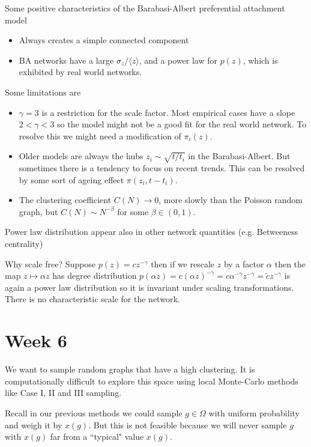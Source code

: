 \documentclass[12pt]{article}
\theoremstyle{definition}
\begin{document}
Some positive characteristics of the Barabasi-Albert preferential attachment model

\begin{itemize}
    \item Always creates a simple connected component
    \item BA networks have a large $\sigma_z/\langle z\rangle$, and a power law for $p(z)$, which is exhibited by real world networks.
\end{itemize}

Some limitations are
\begin{itemize}
    \item $\gamma =3$ is a restriction for the scale factor. Most empirical cases have a slope $2 < \gamma < 3$ so the model might not be a good fit for the real world network. To resolve this we might need a modification of $\pi_i(z)$.
    \item Older models are always the hubs $z_i \sim \sqrt{t/t_i}$ in the Barabasi-Albert. But sometimes there is a tendency to focus on recent trends. This can be resolved by some sort of ageing effect $\pi(z_i, t-t_i)$.

    \item The clustering coefficient $C(N)\to 0$, more slowly than the Poisson random  graph, but $C(N)\sim N^{-\beta}$ for some $\beta \in (0,1)$.
\end{itemize}
Power law distribution appear also in other network quantities (e.g. Betweeness centrality)

    Why scale free? Suppose $p(z) = cz^{-\gamma}$ then if we rescale $z$ by a factor $\alpha$ then the map $z\mapsto \alpha z$ has degree distribution $p(\alpha z ) = c(\alpha z)^{-\gamma} = c\alpha^{-\gamma}z^{-\gamma} = \tilde c z^{-\gamma} $ is again a power law distribution so it is invariant under scaling transformations. There is no characteristic scale for the network.

\newpage
\section*{Week 6}

We want to sample random graphs that have a high clustering. It is computationally difficult to explore this space using local Monte-Carlo methods like Case I, II and III sampling.

Recall in our previous methods we could sample $g\in \Omega$ with uniform probability and weigh it by $x(g)$. But this is not feasible because we will never sample $g$ with $x(g)$ far from a ``typical" value $x(g)$.
\end{document}

